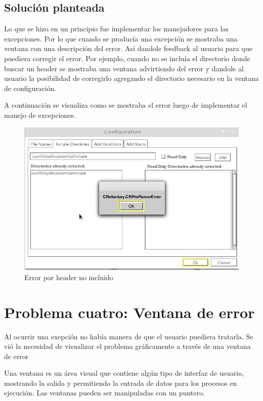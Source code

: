 \documentclass[a4paper,oneside,12pt]{article}
\begin{document}
\subsection{Soluci\'on planteada}
Lo que se hizo en un principio fue implementar los manejadores para las excepciones. Por lo que cuando se produc\'ia una excepci\'on se mostraba una ventana con una descripci\'on del error. As\'i dandole feedback al usuario para que puediera corregir el error. Por ejemplo, cuando no se inclu\'ia el directorio donde buscar un header se mostraba una ventana advirtiendo del error y dandole al usuario la posibilidad de corregirlo agregando el directorio necesario en la ventana de configuraci\'on.

A continuaci\'on se visualiza como se mostraba el error luego de implementar el manejo de excepciones.

\begin{figure}[h!]
  \centering
    \includegraphics[scale=0.50]{images/codigo_modificado/error_header_no_encontrado_sin_view_error.jpg}
     \caption{Error por header no incluido}
\end{figure}

\section{Problema cuatro: Ventana de error}

Al ocurrir una exepci\'on no hab\'ia manera de que el usuario puediera tratarla. Se vi\'o la necesidad de visualizar el problema gr\'aficamente a trav\'es de una ventana de error

Una ventana es un \'area visual que contiene alg\'un tipo de interfaz de usuario, mostrando la salida y permitiendo la entrada de datos para los procesos en ejecuci\'on. Las ventanas pueden ser manipuladas con un puntero.
\end{document}
